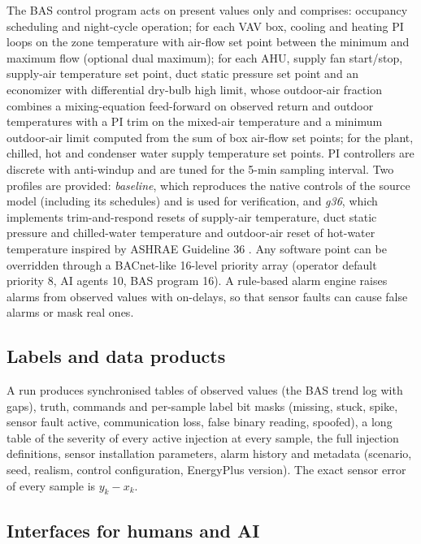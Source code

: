 \documentclass[preprint,12pt,authoryear=false]{elsarticle}
\begin{document}
The BAS control program acts on present values only and comprises: occupancy scheduling and night-cycle operation;
for each VAV box, cooling and heating PI loops on the zone temperature with air-flow set point between the minimum and
maximum flow (optional dual maximum); for each AHU, supply fan start/stop, supply-air temperature set point, duct static
pressure set point and an economizer with differential dry-bulb high limit, whose outdoor-air fraction combines a
mixing-equation feed-forward on observed return and outdoor temperatures with a PI trim on the mixed-air temperature
and a minimum outdoor-air limit computed from the sum of box air-flow set points; for the plant, chilled, hot and
condenser water supply temperature set points. PI controllers are discrete with anti-windup and are tuned for the
5-min sampling interval. Two profiles are provided: \emph{baseline}, which reproduces the native controls of the
source model (including its schedules) and is used for verification, and \emph{g36}, which implements trim-and-respond
resets of supply-air temperature, duct static pressure and chilled-water temperature and outdoor-air reset of hot-water
temperature inspired by ASHRAE Guideline 36 \cite{ashrae2021g36}. Any software point can be overridden through a
BACnet-like 16-level priority array (operator default priority 8, AI agents 10, BAS program 16). A rule-based alarm
engine raises alarms from observed values with on-delays, so that sensor faults can cause false alarms or mask real
ones.

\subsection{Labels and data products}

A run produces synchronised tables of observed values (the BAS trend log with gaps), truth, commands and per-sample
label bit masks (missing, stuck, spike, sensor fault active, communication loss, false binary reading, spoofed), a long
table of the severity of every active injection at every sample, the full injection definitions, sensor installation
parameters, alarm history and metadata (scenario, seed, realism, control configuration, EnergyPlus version). The exact
sensor error of every sample is $y_k-x_k$.

\subsection{Interfaces for humans and AI}
\end{document}
